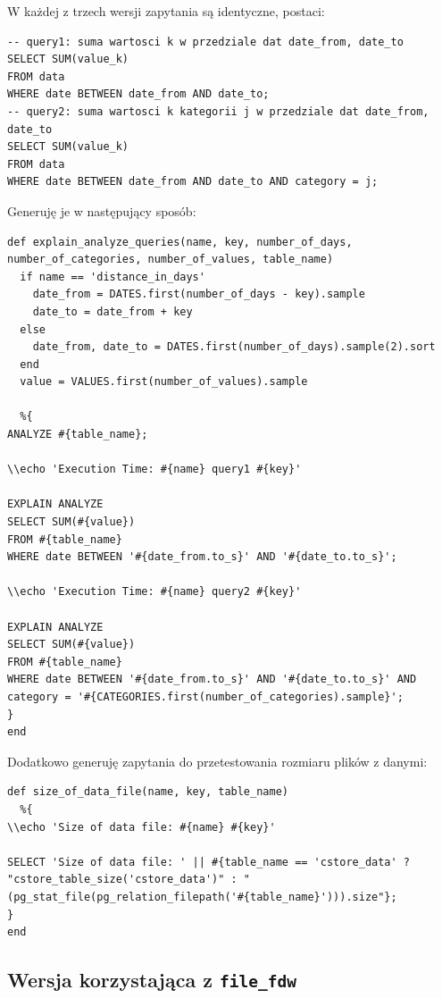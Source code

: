 \documentclass[a4paper,11pt]{article}
\begin{document}
W każdej z trzech wersji zapytania są identyczne, postaci:
\begin{lstlisting}
-- query1: suma wartosci k w przedziale dat date_from, date_to
SELECT SUM(value_k)
FROM data
WHERE date BETWEEN date_from AND date_to;
-- query2: suma wartosci k kategorii j w przedziale dat date_from, date_to
SELECT SUM(value_k)
FROM data
WHERE date BETWEEN date_from AND date_to AND category = j;
\end{lstlisting}
Generuję je w następujący sposób:
\begin{lstlisting}
def explain_analyze_queries(name, key, number_of_days, number_of_categories, number_of_values, table_name)
  if name == 'distance_in_days'
    date_from = DATES.first(number_of_days - key).sample
    date_to = date_from + key
  else
    date_from, date_to = DATES.first(number_of_days).sample(2).sort
  end
  value = VALUES.first(number_of_values).sample

  %{
ANALYZE #{table_name};

\\echo 'Execution Time: #{name} query1 #{key}'

EXPLAIN ANALYZE
SELECT SUM(#{value})
FROM #{table_name}
WHERE date BETWEEN '#{date_from.to_s}' AND '#{date_to.to_s}';

\\echo 'Execution Time: #{name} query2 #{key}'

EXPLAIN ANALYZE
SELECT SUM(#{value})
FROM #{table_name}
WHERE date BETWEEN '#{date_from.to_s}' AND '#{date_to.to_s}' AND category = '#{CATEGORIES.first(number_of_categories).sample}';
}
end
\end{lstlisting}

Dodatkowo generuję zapytania do przetestowania rozmiaru plików z danymi:
\begin{lstlisting}
def size_of_data_file(name, key, table_name)
  %{
\\echo 'Size of data file: #{name} #{key}'

SELECT 'Size of data file: ' || #{table_name == 'cstore_data' ? "cstore_table_size('cstore_data')" : "(pg_stat_file(pg_relation_filepath('#{table_name}'))).size"};
}
end
\end{lstlisting}


\subsection{Wersja korzystająca z \texttt{file\_fdw}}
\end{document}
